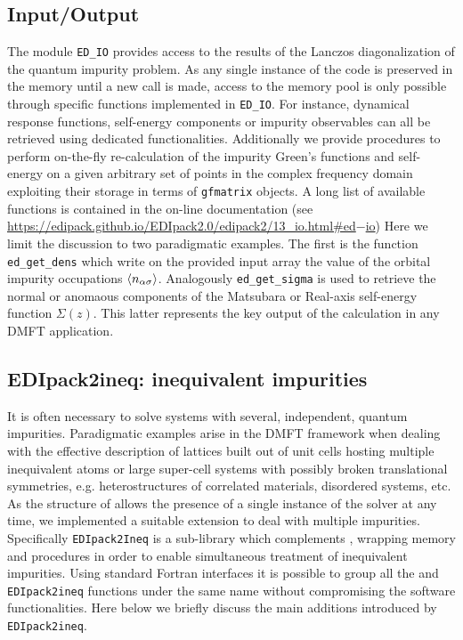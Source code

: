 \documentclass[edipack2.tex]{subfiles}
\begin{document}
\subsection{Input/Output}\label{sSecIO}
The module {\tt ED\_IO} provides access to the results of the Lanczos
diagonalization of the quantum impurity problem.
As any single instance of the code is preserved in the memory until a
new call is made, access to the memory pool is only possible through
specific functions implemented in {\tt ED\_IO}. For instance, dynamical response functions, self-energy components or impurity
observables can all be retrieved using dedicated functionalities.
Additionally we provide procedures to perform on-the-fly
re-calculation of the impurity Green's functions and self-energy on a
given arbitrary set of points in the complex frequency domain
exploiting their storage in terms of {\tt gfmatrix} objects.
A long list of available functions is contained in the on-line
documentation (see
\href{https://edipack.github.io/EDIpack2.0/edipack2/13_io.html#ed-io}{https://edipack.github.io/EDIpack2.0/edipack2/13\_io.html\#ed$-$io})
Here we limit the discussion to two paradigmatic examples.
The first is the function {\tt ed\_get\_dens} which write on the
provided input array the value of the orbital impurity occupations
$\langle n_{\alpha\sigma}\rangle$. Analogously {\tt ed\_get\_sigma} is used to
retrieve the normal or anomaous components of the Matsubara or
Real-axis self-energy function $\Sigma(z)$. This latter represents the
key output of the calculation in 
any DMFT application. 








\subsection{EDIpack2ineq: inequivalent impurities}\label{sSecIneq}
It is often necessary to solve systems with several, independent,
quantum impurities. Paradigmatic examples arise in the DMFT
framework when dealing with the effective description of lattices
built out of unit cells hosting multiple inequivalent atoms or large
super-cell systems with possibly broken translational symmetries,
e.g. heterostructures of correlated materials, disordered systems,
etc.
As the structure of \NAME allows the presence of a single instance of
the solver at any time, we implemented a suitable extension to deal
with multiple impurities. Specifically {\tt EDIpack2Ineq} is a
sub-library which complements \NAME, wrapping memory and procedures in
order to enable simultaneous treatment of  inequivalent impurities. 
Using standard Fortran interfaces it is possible to group all the
\NAME and {\tt EDIpack2ineq} functions under the same name without
compromising the software functionalities.  
Here below we briefly discuss the main additions introduced by {\tt
  EDIpack2ineq}. 
\end{document}
